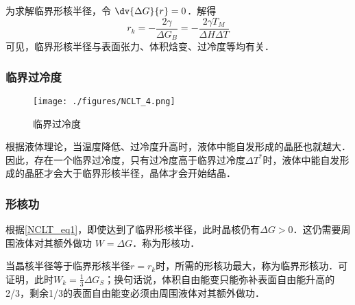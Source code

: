 为求解临界形核半径，令 $\dv{\Delta G}{r} = 0$．解得
\begin{equation}
r_k=-\frac{2\gamma}{\Delta G_B}=-\frac{2\gamma T_M}{\Delta H \Delta T}
\end{equation}
可见，临界形核半径与表面张力、体积焓变、过冷度等均有关．

\subsubsection{临界过冷度}

\begin{figure}[ht]
\centering
\texttt{[image: ./figures/NCLT\_4.png]}
\caption{临界过冷度} \label{NCLT_fig4}
\end{figure}
根据液体理论，当温度降低、过冷度升高时，液体中能自发形成的晶胚也就越大．因此，存在一个临界过冷度，只有过冷度高于临界过冷度$\Delta T^*$时，液体中能自发形成的晶胚才会大于临界形核半径，晶体才会开始结晶．

\subsubsection{形核功}
根据\autoref{NCLT_eq1}，即使达到了临界形核半径，此时晶核仍有$\Delta G>0$．这仍需要周围液体对其额外做功 $W=\Delta G$．称为形核功．

当晶核半径等于临界形核半径$r=r_k$时，所需的形核功最大，称为临界形核功．可证明，此时$W_k=\frac{1}{3}\Delta G_S$；换句话说，体积自由能变只能弥补表面自由能升高的2/3，剩余1/3的表面自由能变必须由周围液体对其额外做功．

